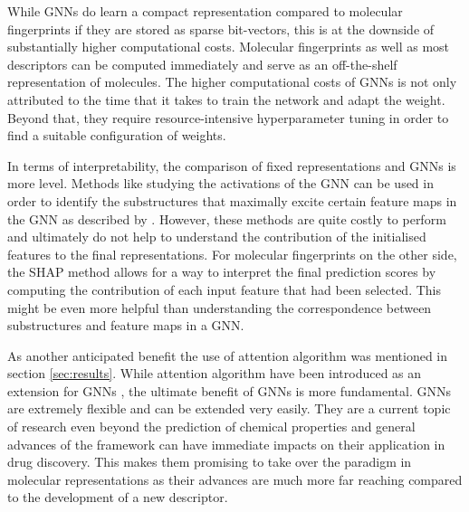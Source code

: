 While GNNs do learn a compact representation compared to molecular fingerprints if they are stored as sparse bit-vectors, this is at the downside of substantially higher computational costs. Molecular fingerprints as well as most descriptors can be computed immediately and serve as an off-the-shelf representation of molecules. The higher computational costs of GNNs is not only attributed to the time that it takes to train the network and adapt the weight. Beyond that, they require resource-intensive hyperparameter tuning in order to find a suitable configuration of weights. 

In terms of interpretability, the comparison of fixed representations and GNNs is more level. Methods like studying the activations of the GNN can be used in order to identify the substructures that maximally excite certain feature maps in the GNN as described by \cite{duvenaud2015convolutional}. However, these methods are quite costly to perform and ultimately do not help to understand the contribution of the initialised features to the final representations. For molecular fingerprints on the other side, the SHAP method \citep{lundberg2017unified} allows for a way to interpret the final prediction scores by computing the contribution of each input feature that had been selected. This might be even more helpful than understanding the correspondence between substructures and feature maps in a GNN. 

As another anticipated benefit the use of attention algorithm was mentioned in section \ref{sec:results}. While attention algorithm have been introduced as an extension for GNNs \citep{graphattentionmpp}, the ultimate benefit of GNNs is more fundamental. GNNs are extremely flexible and can be extended very easily. They are a current topic of research even beyond the prediction of chemical properties and general advances of the framework can have immediate impacts on their application in drug discovery. This makes them promising to take over the paradigm in molecular representations as their advances are much more far reaching compared to the development of a new descriptor.

